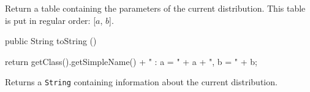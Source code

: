 \begin{tabb}
   Return a table containing the parameters of the current distribution.
   This table is put in regular order: [$a$, $b$].
\end{tabb}
\begin{hide}\begin{code}

   public String toString ()\begin{hide} {
      return getClass().getSimpleName() + " : a = " + a + ", b = " + b;
   }\end{hide}
\end{code}
\begin{tabb}
   Returns a \texttt{String} containing information about the current distribution.
\end{tabb}\end{hide}
\begin{code}\begin{hide}
}\end{hide}
\end{code}
